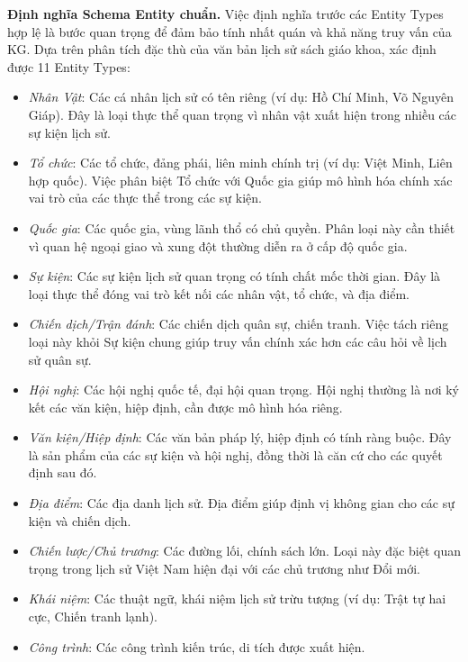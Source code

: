 \vspace{0.5em}
\noindent\textbf{Định nghĩa Schema Entity chuẩn.}
Việc định nghĩa trước các Entity Types hợp lệ là bước quan trọng để đảm bảo tính nhất quán và khả năng truy vấn của KG. Dựa trên phân tích đặc thù của văn bản lịch sử sách giáo khoa, xác định được 11 Entity Types:

\begin{itemize}
    \item \textit{Nhân Vật}: Các cá nhân lịch sử có tên riêng (ví dụ: Hồ Chí Minh, Võ Nguyên Giáp). Đây là loại thực thể quan trọng vì nhân vật xuất hiện trong nhiều các sự kiện lịch sử.
    \item \textit{Tổ chức}: Các tổ chức, đảng phái, liên minh chính trị (ví dụ: Việt Minh, Liên hợp quốc). Việc phân biệt Tổ chức với Quốc gia giúp mô hình hóa chính xác vai trò của các thực thể trong các sự kiện.
    \item \textit{Quốc gia}: Các quốc gia, vùng lãnh thổ có chủ quyền. Phân loại này cần thiết vì quan hệ ngoại giao và xung đột thường diễn ra ở cấp độ quốc gia.
    \item \textit{Sự kiện}: Các sự kiện lịch sử quan trọng có tính chất mốc thời gian. Đây là loại thực thể đóng vai trò kết nối các nhân vật, tổ chức, và địa điểm.
    \item \textit{Chiến dịch/Trận đánh}: Các chiến dịch quân sự, chiến tranh. Việc tách riêng loại này khỏi Sự kiện chung giúp truy vấn chính xác hơn các câu hỏi về lịch sử quân sự.
    \item \textit{Hội nghị}: Các hội nghị quốc tế, đại hội quan trọng. Hội nghị thường là nơi ký kết các văn kiện, hiệp định, cần được mô hình hóa riêng.
    \item \textit{Văn kiện/Hiệp định}: Các văn bản pháp lý, hiệp định có tính ràng buộc. Đây là sản phẩm của các sự kiện và hội nghị, đồng thời là căn cứ cho các quyết định sau đó.
    \item \textit{Địa điểm}: Các địa danh lịch sử. Địa điểm giúp định vị không gian cho các sự kiện và chiến dịch.
    \item \textit{Chiến lược/Chủ trương}: Các đường lối, chính sách lớn. Loại này đặc biệt quan trọng trong lịch sử Việt Nam hiện đại với các chủ trương như Đổi mới.
    \item \textit{Khái niệm}: Các thuật ngữ, khái niệm lịch sử trừu tượng (ví dụ: Trật tự hai cực, Chiến tranh lạnh).
    \item \textit{Công trình}: Các công trình kiến trúc, di tích được xuất hiện.
\end{itemize}

